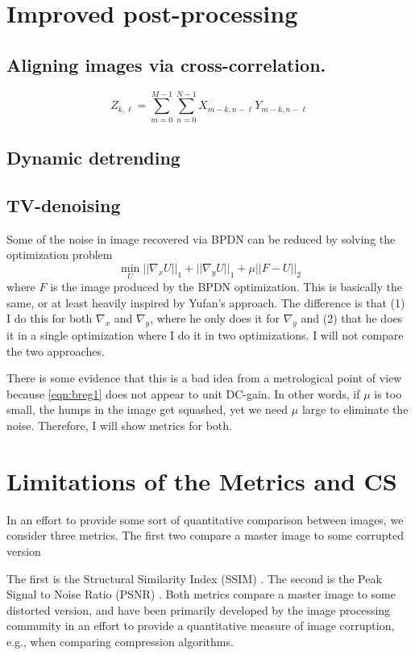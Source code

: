 \documentclass[11pt]{article}
\begin{document}
\section{Improved post-processing}
\subsection{Aligning images via cross-correlation.}
\begin{equation}
  Z_{k,\ell} = \sum_{m=0}^{M-1}\sum_{n=0}^{N-1} X_{m-k, n-\ell}Y_{m-k, n-\ell}
\end{equation}
\subsection{Dynamic detrending}


\subsection{ TV-denoising}
Some of the noise in image recovered via BPDN can be reduced by solving the optimization problem
\begin{equation}
  \min_{U} ||\nabla_xU||_1 + ||\nabla_yU||_1 + \mu||F - U||_2 \label{eqn:breg1}
\end{equation}
where $F$ is the image produced by the BPDN optimization. 
This is basically the same, or at least heavily inspired by Yufan's approach. The difference is that (1) I do this for both $\nabla_x$ and $\nabla_y$, where he only does it for $\nabla_y$ and (2) that he does it in a single optimization where I do it in two optimizations. I will not compare the two approaches.

There is some evidence that this is a bad idea from a metrological point of view because \eqref{eqn:breg1} does not appear to unit DC-gain. In other words, if $\mu$ is too small, the humps in the image get squashed, yet we need $\mu$ large to eliminate the noise. Therefore, I will show metrics for both.

\section{Limitations of the Metrics and CS}
In an effort to provide some sort of quantitative comparison between images, we consider three metrics. The first two compare a master image to some corrupted version

The first is the Structural Similarity Index (SSIM) \cite{wang_image_2004}. The second is the Peak Signal to Noise Ratio (PSNR) \cite{Luo_nano_2015}. Both metrics compare a master image to some distorted version, and have been primarily developed by the image processing community in an effort to provide a quantitative measure of image corruption, e.g., when comparing compression algorithms.
\end{document}
